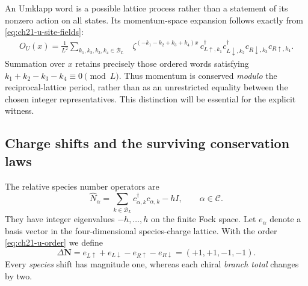 An Umklapp word is a possible lattice process rather than a statement of
its nonzero action on all states.  Its momentum-space expansion follows
exactly from \eqref{eq:ch21-u-site-fields}:
\begin{align}
 O_U(x)=\frac1{L^2}\!
 \sum_{k_1,k_2,k_3,k_4\in\mathcal B_L}
 &\zeta^{(-k_1-k_2+k_3+k_4)x}\,
 c_{L\uparrow,k_1}^\dagger c_{L\downarrow,k_2}^\dagger
 c_{R\downarrow,k_3}c_{R\uparrow,k_4}.
 \label{eq:ch21-u-fourier-expansion}
\end{align}
Summation over \(x\) retains precisely those ordered words satisfying
\(k_1+k_2-k_3-k_4\equiv0\pmod L\).  Thus momentum is conserved
\emph{modulo} the reciprocal-lattice period, rather than as an
unrestricted equality between the chosen integer representatives.
This distinction will be essential for the explicit witness.

\subsection*{Charge shifts and the surviving conservation laws}

The relative species number operators are
\begin{equation}
 \widehat N_\alpha=\sum_{k\in\mathcal B_L}
     c_{\alpha,k}^\dagger c_{\alpha,k}-hI,
 \qquad \alpha\in\mathcal C.
 \label{eq:ch21-u-relative-charge}
\end{equation}
They have integer eigenvalues \(-h,\ldots,h\) on the finite Fock space.
Let \(e_\alpha\) denote a basis vector in the four-dimensional
species-charge lattice.  With the order \eqref{eq:ch21-u-order} we define
\begin{equation}
 \Delta\mathbf N
  =e_{L\uparrow}+e_{L\downarrow}
     -e_{R\uparrow}-e_{R\downarrow}
  =(+1,+1,-1,-1).
 \label{eq:ch21-u-charge-vector}
\end{equation}
Every \emph{species} shift has magnitude one, whereas each chiral
\emph{branch total} changes by two.

